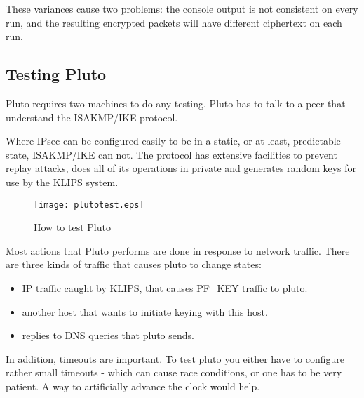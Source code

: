 These variances cause two problems: the console output is not consistent on
every run, and the resulting encrypted packets will have different ciphertext 
on each run. 


\subsection{Testing Pluto}

Pluto requires two machines to do any testing. Pluto has to talk to
a peer that understand the ISAKMP/IKE protocol. 

Where IPsec can be configured easily to be in a static, or at least,
predictable state, ISAKMP/IKE can not. The protocol has extensive facilities
to prevent replay attacks, does all of its operations in private and
generates random keys for use by the KLIPS system.

\begin{figure}
\texttt{[image: plutotest.eps]} 
\caption{How to test Pluto}
\label{plutotest}
\end{figure}

Most actions that Pluto performs are done in response to
network traffic. There are three kinds of traffic that causes pluto to
change states:
\begin{itemize}
\item IP traffic caught by KLIPS, that causes PF\_KEY traffic to pluto.
\item another host that wants to initiate keying with this host.
\item replies to DNS queries that pluto sends.
\end{itemize}

In addition, timeouts are important. To test pluto you either have to
configure rather small timeouts - which can cause race conditions, or
one has to be very patient. A way to artificially advance the clock
would help.



